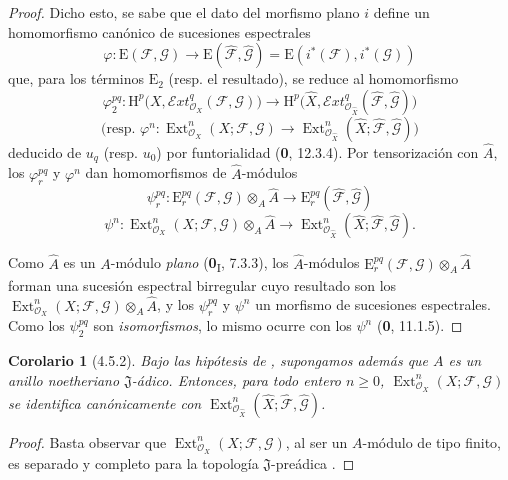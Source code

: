 \documentclass[10pt,oneside,openany]{book}
\theoremstyle{egaenv}\newtheorem*{env}{---}
\theoremstyle{egastatement}
\newtheorem*{corollary}{Corolario}
\theoremstyle{egadescription}
\renewcommand{\geq}{\geqslant}
\begin{document}
\begin{proof}
Dicho esto, se sabe que el dato del morfismo plano $i$ define un
homomorfismo canónico de sucesiones espectrales
\[
\varphi:\mathrm E(\mathcal F,\mathcal G)\longrightarrow
\mathrm E(\widehat{\mathcal F},\widehat{\mathcal G})
=\mathrm E(i^*(\mathcal F),i^*(\mathcal G))
\]
que, para los términos $\mathrm E_2$ (resp. el resultado), se reduce al
homomorfismo
\[
\varphi_2^{pq}:\mathrm H^p\bigl(X,
\mathcal{E}\!xt^q_{\mathcal O_X}(\mathcal F,\mathcal G)\bigr)
\longrightarrow
\mathrm H^p\bigl(\widehat X,
\mathcal{E}\!xt^q_{\mathcal O_{\widehat X}}
(\widehat{\mathcal F},\widehat{\mathcal G})\bigr)
\]
\[
\text{(resp. }\varphi^n:\operatorname{Ext}^n_{\mathcal O_X}
(X;\mathcal F,\mathcal G)\longrightarrow
\operatorname{Ext}^n_{\mathcal O_{\widehat X}}
(\widehat X;\widehat{\mathcal F},\widehat{\mathcal G})\text{)}
\]
deducido de $u_q$ (resp. $u_0$) por funtorialidad (\textbf{0}, 12.3.4). Por
tensorización con $\widehat A$, los $\varphi_r^{pq}$ y $\varphi^n$ dan
homomorfismos de $\widehat A$-módulos
\[
\psi_r^{pq}:\mathrm E_r^{pq}(\mathcal F,\mathcal G)
\otimes_A\widehat A\longrightarrow
\mathrm E_r^{pq}(\widehat{\mathcal F},\widehat{\mathcal G})
\]
\[
\psi^n:\operatorname{Ext}^n_{\mathcal O_X}(X;\mathcal F,\mathcal G)
\otimes_A\widehat A\longrightarrow
\operatorname{Ext}^n_{\mathcal O_{\widehat X}}
(\widehat X;\widehat{\mathcal F},\widehat{\mathcal G}).
\]

Como $\widehat A$ es un $A$-módulo \emph{plano} (\textbf{0}\textsubscript{I}, 7.3.3), los
$\widehat A$-módulos
$\mathrm E_r^{pq}(\mathcal F,\mathcal G)\otimes_A\widehat A$ forman una
sucesión espectral birregular cuyo resultado son los
$\operatorname{Ext}^n_{\mathcal O_X}(X;\mathcal F,\mathcal G)\otimes_A\widehat A$, y los
$\psi_r^{pq}$ y $\psi^n$ un morfismo de sucesiones espectrales. Como los
$\psi_2^{pq}$ son \emph{isomorfismos}, lo mismo ocurre con los $\psi^n$
(\textbf{0}, 11.1.5).
\end{proof}

\begin{corollary}[4.5.2]
\label{III.4.5.2}
\label{III.4.5.2-fr}
Bajo las hipótesis de , supongamos además que $A$ es
un anillo noetheriano $\mathfrak J$-ádico. Entonces, para todo entero
$n\geq0$, $\operatorname{Ext}^n_{\mathcal O_X}(X;\mathcal F,\mathcal G)$
se identifica canónicamente con
$\operatorname{Ext}^n_{\mathcal O_{\widehat X}}
(\widehat X;\widehat{\mathcal F},\widehat{\mathcal G})$.
\end{corollary}

\begin{proof}
Basta observar que $\operatorname{Ext}^n_{\mathcal O_X}
(X;\mathcal F,\mathcal G)$, al ser un $A$-módulo de tipo finito, es separado y
completo para la topología $\mathfrak J$-preádica .
\end{proof}
\end{document}
